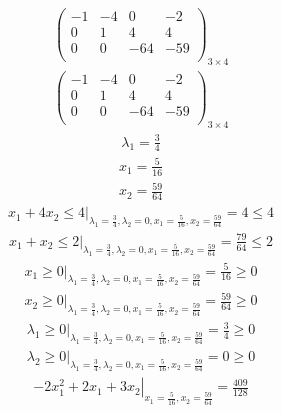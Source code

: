 \documentclass{article}
\begin{document}
\begin{align*}
\left(
\begin{array}{ccc|c}
-1 & -4 & 0 & -2\\
0 & 1 & 4 & 4\\
0 & 0 & -64 & -59\\
\end{array}
\right)_{3\times 4}
\end{align*}
\begin{align*}
\left(
\begin{array}{ccc|c}
-1 & -4 & 0 & -2\\
0 & 1 & 4 & 4\\
0 & 0 & -64 & -59\\
\end{array}
\right)_{3\times 4}
\end{align*}
\begin{align*}
\lambda_{1}=\frac{3}{4}\end{align*}
\begin{align*}
x_{1}=\frac{5}{16}\end{align*}
\begin{align*}
x_{2}=\frac{59}{64}\end{align*}
\begin{align*}
\left.x_{1} + 4x_{2}\le4\right|_{\lambda_{1}=\frac{3}{4},\lambda_{2}=0,x_{1}=\frac{5}{16},x_{2}=\frac{59}{64}}=4\le4\end{align*}
\begin{align*}
\left.x_{1} + x_{2}\le2\right|_{\lambda_{1}=\frac{3}{4},\lambda_{2}=0,x_{1}=\frac{5}{16},x_{2}=\frac{59}{64}}=\frac{79}{64}\le2\end{align*}
\begin{align*}
\left.x_{1}\ge0\right|_{\lambda_{1}=\frac{3}{4},\lambda_{2}=0,x_{1}=\frac{5}{16},x_{2}=\frac{59}{64}}=\frac{5}{16}\ge0\end{align*}
\begin{align*}
\left.x_{2}\ge0\right|_{\lambda_{1}=\frac{3}{4},\lambda_{2}=0,x_{1}=\frac{5}{16},x_{2}=\frac{59}{64}}=\frac{59}{64}\ge0\end{align*}
\begin{align*}
\left.\lambda_{1}\ge0\right|_{\lambda_{1}=\frac{3}{4},\lambda_{2}=0,x_{1}=\frac{5}{16},x_{2}=\frac{59}{64}}=\frac{3}{4}\ge0\end{align*}
\begin{align*}
\left.\lambda_{2}\ge0\right|_{\lambda_{1}=\frac{3}{4},\lambda_{2}=0,x_{1}=\frac{5}{16},x_{2}=\frac{59}{64}}=0\ge0\end{align*}
\begin{align*}
\left.-2x_{1}^{2} + 2x_{1} + 3x_{2}\right|_{x_{1}=\frac{5}{16},x_{2}=\frac{59}{64}}=\frac{409}{128}\end{align*}
\end{document}
